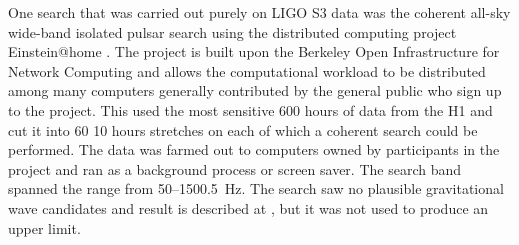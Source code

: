 \documentclass{article}
\begin{document}
One search that was carried out purely on LIGO S3 data was the coherent all-sky
wide-band isolated pulsar search using the distributed computing project
Einstein@home \cite{eath}. The project is built upon the Berkeley Open
Infrastructure for Network Computing \cite{BOINC} and allows the computational
workload to be distributed among many computers generally contributed by the
general public who sign up to the project. This used the most sensitive 600 hours
of data from the H1 and cut it into 60 10 hours stretches on each of which a
coherent search could be performed. The data was farmed out to computers owned
by participants in the project and ran as a background process or screen saver.
The search band spanned the range from 50--1500.5~Hz. The search saw no
plausible gravitational wave candidates and result is described at
\cite{eathS3}, but it was not used to produce an upper limit.
\end{document}
